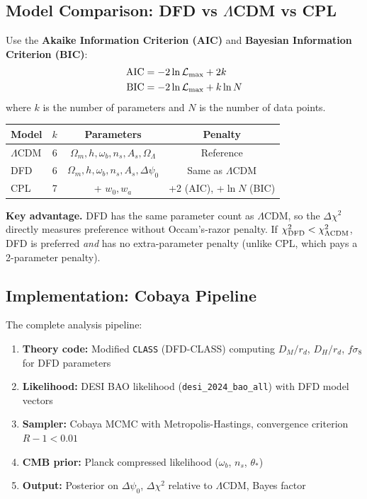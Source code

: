 \documentclass[11pt,a4paper]{article}
\newcommand{\LCDM}{$\Lambda$CDM}
\newcommand{\CLASS}{\texttt{CLASS}}
\begin{document}
\subsection{Model Comparison: DFD vs \LCDM{} vs CPL}

Use the \textbf{Akaike Information Criterion (AIC)} and
\textbf{Bayesian Information Criterion (BIC)}:
\begin{align}
\text{AIC} &= -2\ln\mathcal{L}_{\rm max} + 2k \\
\text{BIC} &= -2\ln\mathcal{L}_{\rm max} + k\ln N
\end{align}
where $k$ is the number of parameters and $N$ is the number of data
points.

\begin{center}
\begin{tabular}{lccc}
\toprule
Model & $k$ & Parameters & Penalty \\
\midrule
\LCDM{} & 6 & $\Omega_m, h, \omega_b, n_s, A_s, \Omega_\Lambda$ &
  Reference \\
DFD & 6 & $\Omega_m, h, \omega_b, n_s, A_s, \Delta\psi_0$ &
  Same as \LCDM{} \\
CPL & 7 & + $w_0, w_a$ & +2 (AIC), +$\ln N$ (BIC) \\
\bottomrule
\end{tabular}
\end{center}

\textbf{Key advantage.} DFD has the same parameter count as \LCDM{},
so the $\Delta\chi^2$ directly measures preference without
Occam's-razor penalty. If $\chi^2_{\rm DFD} < \chi^2_{\Lambda\rm CDM}$,
DFD is preferred \emph{and} has no extra-parameter penalty (unlike
CPL, which pays a 2-parameter penalty).

\subsection{Implementation: Cobaya Pipeline}

The complete analysis pipeline:

\begin{enumerate}
\item \textbf{Theory code:} Modified \CLASS{} (DFD-CLASS) computing
  $D_M/r_d$, $D_H/r_d$, $f\sigma_8$ for DFD parameters
\item \textbf{Likelihood:} DESI BAO likelihood
  (\texttt{desi\_2024\_bao\_all}) with DFD model vectors
\item \textbf{Sampler:} Cobaya MCMC with Metropolis-Hastings,
  convergence criterion $R-1 < 0.01$
\item \textbf{CMB prior:} Planck compressed likelihood
  ($\omega_b$, $n_s$, $\theta_*$)
\item \textbf{Output:} Posterior on $\Delta\psi_0$, $\Delta\chi^2$
  relative to \LCDM{}, Bayes factor
\end{enumerate}
\end{document}
